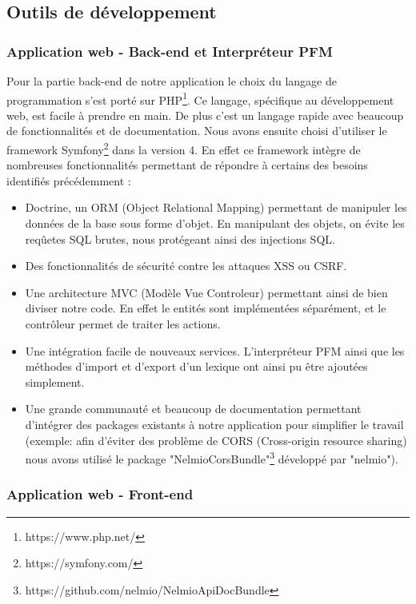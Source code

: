 \documentclass[12pt,a4paper]{article}
\begin{document}
    \subsection{Outils de développement}

    \subsubsection{Application web - Back-end et Interpréteur PFM}
    Pour la partie back-end de notre application le choix du langage de programmation s'est porté sur PHP\footnote{https://www.php.net/}.
    Ce langage, spécifique au développement web, est facile à prendre en main. De plus c'est un langage rapide avec beaucoup de fonctionnalités et de documentation.
    \smallbreak
    Nous avons ensuite choisi d'utiliser le framework Symfony\footnote{https://symfony.com/} dans la version 4.
    En effet ce framework intègre de nombreuses fonctionnalités permettant de répondre à certains des besoins identifiés précédemment :
    \begin{itemize}
        \item Doctrine, un ORM (Object Relational Mapping) permettant de manipuler les données de la base sous forme d'objet. En manipulant des objets, on évite les reqûetes SQL brutes, nous protégeant ainsi des injections SQL.
        \item Des fonctionnalités de sécurité contre les attaques XSS ou CSRF.
        \item Une architecture MVC (Modèle Vue Controleur) permettant ainsi de bien diviser notre code. En effet le entités sont implémentées séparément, et le contrôleur permet de traiter les actions.
        \item Une intégration facile de nouveaux services. L'interpréteur PFM ainsi que les méthodes d'import et d'export d'un lexique ont ainsi pu être ajoutées simplement.
        \item Une grande communauté et beaucoup de documentation permettant d'intégrer des packages existants à notre application pour simplifier le travail (exemple: afin d'éviter des problème de CORS (Cross-origin resource sharing) nous avons utilisé le package "NelmioCorsBundle"\footnote{https://github.com/nelmio/NelmioApiDocBundle} développé par "nelmio").

    \end{itemize}
    \smallbreak

    \subsubsection{Application web - Front-end}
\end{document}
